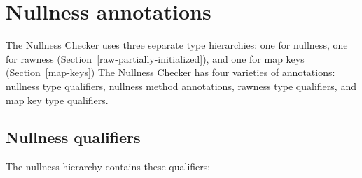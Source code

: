 \section{Nullness annotations\label{nullness-annotations}}

The Nullness Checker uses three separate type hierarchies:  one for nullness,
one for rawness (Section~\ref{raw-partially-initialized}),
and one for map keys (Section~\ref{map-keys})
The Nullness Checker has four varieties of annotations:  nullness
type qualifiers, nullness method annotations, rawness type qualifiers, and
map key type
qualifiers.

\subsection{Nullness qualifiers\label{nullness-qualifiers}}

The nullness hierarchy contains these qualifiers:

